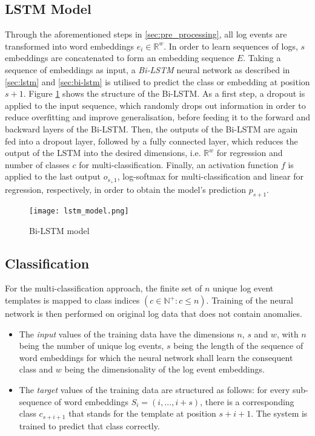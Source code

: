 \subsection{LSTM Model\label{sec:lstm-model}}
Through the aforementioned steps in \ref{sec:pre_processing}, all log events are transformed into word embeddings $e_i \in \mathbb{R}^w$. In order to learn sequences of logs, $s$ embeddings are concatenated to form an embedding sequence $E$. Taking a sequence of embeddings as input, a \textit{Bi-LSTM} neural network as described in \ref{sec:lstm} and \ref{sec:bi-lstm} is utilised to predict the class or embedding at position $s+1$. Figure \ref{fig:lstm_model} shows the structure of the Bi-LSTM. As a first step, a dropout is applied to the input sequence, which randomly drops out information in order to reduce overfitting and improve generalisation, before feeding it to the forward and backward layers of the Bi-LSTM. Then, the outputs of the Bi-LSTM are again fed into a dropout layer, followed by a fully connected layer, which reduces the output of the LSTM into the desired dimensions, i.e. $\mathbb{R}^w$ for regression and number of classes $c$ for multi-classification. Finally, an activation function $f$ is applied to the last output $o_{s_+1}$, log-softmax for multi-classification and linear for regression, respectively, in order to obtain the model's prediction $p_{s+1}$.


\begin{figure}[H]
	\centering	
	\texttt{[image: lstm\_model.png]}
	\caption{Bi-LSTM model}
	\label{fig:lstm_model}
\end{figure}

\subsection{Classification \label{sec:classification}}
For the multi-classification approach, the finite set of $n$ unique log event templates is mapped to class indices $(c \in \mathbb{N}^{+}: c \leq n)$. Training of the neural network is then performed on original log data that does not contain anomalies.
\begin{itemize}
\setlength\itemsep{-0.5em}
	\item The \textit{input} values of the training data have the dimensions $n$, $s$ and $w$, with $n$ being the number of unique log events, $s$ being the length of the sequence of word embeddings for which the neural network shall learn the consequent class and $w$ being the dimensionality of the log event embeddings.
	\item The \textit{target} values of the training data are structured as follows: for every sub-sequence of word embeddings $S_i = (i, ..., i+s)$, there is a corresponding class $c_{s+i+1}$ that stands for the template at position $s+i+1$. The system is trained to predict that class correctly.
\end{itemize}

